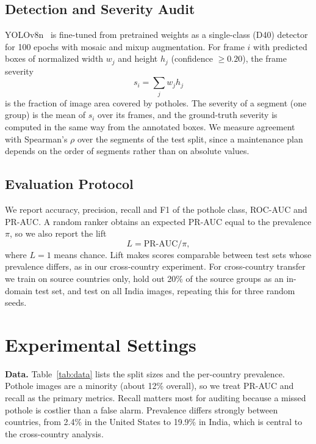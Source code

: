 \documentclass[conference]{IEEEtran}
\begin{document}
\subsection{Detection and Severity Audit}
YOLOv8n~\cite{jocher2023yolo} is fine-tuned from pretrained weights as a single-class (D40) detector for 100 epochs with mosaic and mixup augmentation. For frame $i$ with predicted boxes of normalized width $w_j$ and height $h_j$ (confidence $\geq 0.20$), the frame severity
\begin{equation}
s_i=\sum_j w_j h_j \label{eq:sev}
\end{equation}
is the fraction of image area covered by potholes. The severity of a segment (one group) is the mean of $s_i$ over its frames, and the ground-truth severity is computed in the same way from the annotated boxes. We measure agreement with Spearman's $\rho$ over the segments of the test split, since a maintenance plan depends on the order of segments rather than on absolute values.

\subsection{Evaluation Protocol}
We report accuracy, precision, recall and F1 of the pothole class, ROC-AUC and PR-AUC. A random ranker obtains an expected PR-AUC equal to the prevalence $\pi$, so we also report the lift
\begin{equation}
L=\mathrm{PR\text{-}AUC}/\pi, \label{eq:lift}
\end{equation}
where $L=1$ means chance. Lift makes scores comparable between test sets whose prevalence differs, as in our cross-country experiment. For cross-country transfer we train on source countries only, hold out 20\% of the source groups as an in-domain test set, and test on all India images, repeating this for three random seeds.

\section{Experimental Settings}
\textbf{Data.} Table~\ref{tab:data} lists the split sizes and the per-country prevalence. Pothole images are a minority (about 12\% overall), so we treat PR-AUC and recall as the primary metrics. Recall matters most for auditing because a missed pothole is costlier than a false alarm. Prevalence differs strongly between countries, from 2.4\% in the United States to 19.9\% in India, which is central to the cross-country analysis.
\end{document}
